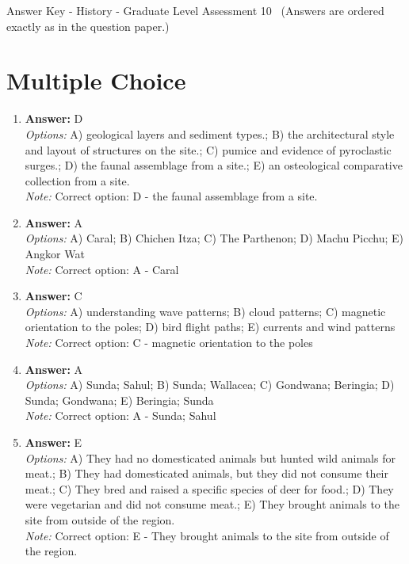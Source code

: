 \documentclass[12pt]{article}
\begin{document}
\begin{center}
Answer Key - History - Graduate Level Assessment 10 \
\small (Answers are ordered exactly as in the question paper.)
\end{center}

\section*{Multiple Choice}
\begin{enumerate}[label=\arabic*.]
\item \textbf{Answer:} D
\\ \textit{Options:} A) geological layers and sediment types.; B) the architectural style and layout of structures on the site.; C) pumice and evidence of pyroclastic surges.; D) the faunal assemblage from a site.; E) an osteological comparative collection from a site.
\\ \textit{Note:} Correct option: D - the faunal assemblage from a site.
\item \textbf{Answer:} A
\\ \textit{Options:} A) Caral; B) Chichen Itza; C) The Parthenon; D) Machu Picchu; E) Angkor Wat
\\ \textit{Note:} Correct option: A - Caral
\item \textbf{Answer:} C
\\ \textit{Options:} A) understanding wave patterns; B) cloud patterns; C) magnetic orientation to the poles; D) bird flight paths; E) currents and wind patterns
\\ \textit{Note:} Correct option: C - magnetic orientation to the poles
\item \textbf{Answer:} A
\\ \textit{Options:} A) Sunda; Sahul; B) Sunda; Wallacea; C) Gondwana; Beringia; D) Sunda; Gondwana; E) Beringia; Sunda
\\ \textit{Note:} Correct option: A - Sunda; Sahul
\item \textbf{Answer:} E
\\ \textit{Options:} A) They had no domesticated animals but hunted wild animals for meat.; B) They had domesticated animals, but they did not consume their meat.; C) They bred and raised a specific species of deer for food.; D) They were vegetarian and did not consume meat.; E) They brought animals to the site from outside of the region.
\\ \textit{Note:} Correct option: E - They brought animals to the site from outside of the region.
\end{enumerate}
\end{document}
